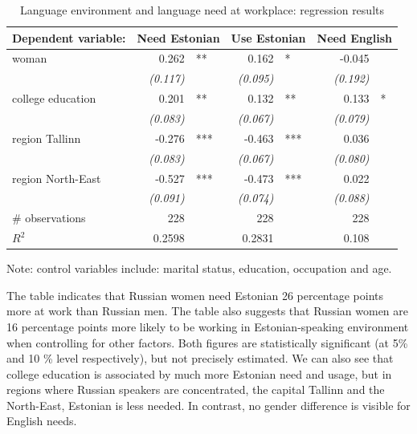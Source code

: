 \documentclass[12pt, a4paper]{article}
\newcommand{\std}[1]{\emph{(#1)}}
\begin{document}
\begin{table}[t]
	\centering
	\caption{Language environment and language need at workplace:
		regression results}
	\label{tab:environment_model}
	\begin{tabular}{l r@{}l r@{}l r@{}l}
		\toprule
		Dependent variable: & \multicolumn{2}{c}{Need Estonian} & \multicolumn{2}{c}{Use Estonian} & \multicolumn{2}{c}{Need English} \\ \midrule
		woman             & 0.262       & **  & 0.162       & *   & -0.045      &   \\
		                  & \std{0.117} &     & \std{0.095} &     & \std{0.192} &   \\
		college education & 0.201       & **  & 0.132       & **  & 0.133       & * \\
		                  & \std{0.083} &     & \std{0.067} &     & \std{0.079} &   \\
		region Tallinn    & -0.276      & *** & -0.463      & *** & 0.036       &   \\
		                  & \std{0.083} &     & \std{0.067} &     & \std{0.080} &   \\
		region North-East & -0.527      & *** & -0.473      & *** & 0.022       &   \\
		                  & \std{0.091} &     & \std{0.074} &     & \std{0.088} &   \\ \midrule
		\# observations             & 228         &     & 228         &     & 228         &   \\
		$R^{2}$           & 0.2598      &     & 0.2831      &     & 0.108       &   \\ \bottomrule
	\end{tabular}
	\begin{flushleft}
		Note: control variables include: marital status, education,
		occupation and age.
	\end{flushleft}
\end{table}

The table indicates that Russian women need Estonian 26 percentage
points more at work than Russian men.  The table also suggests that
Russian women are 16 percentage points more likely to be working in
Estonian-speaking environment when controlling for other factors.
Both figures are statistically significant (at 5\% and 10 \% level
respectively), but not precisely estimated.  We can also see that
college education is associated by much more Estonian need and usage,
but in regions where Russian speakers are concentrated, the capital
Tallinn and the North-East, Estonian is less needed.  In contrast, no
gender difference is visible for English needs.
\end{document}
